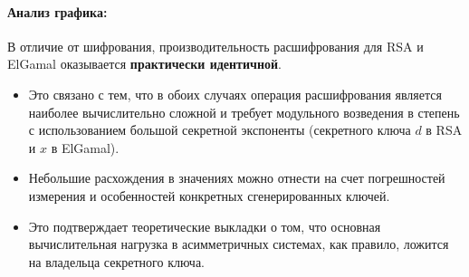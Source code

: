 \paragraph{Анализ графика:}
В отличие от шифрования, производительность расшифрования для RSA и ElGamal оказывается \textbf{практически идентичной}.
\begin{itemize}
    \item Это связано с тем, что в обоих случаях операция расшифрования является наиболее вычислительно сложной и требует модульного возведения в степень с использованием большой секретной экспоненты (секретного ключа $d$ в RSA и $x$ в ElGamal). 
    \item Небольшие расхождения в значениях можно отнести на счет погрешностей измерения и особенностей конкретных сгенерированных ключей.
    \item Это подтверждает теоретические выкладки о том, что основная вычислительная нагрузка в асимметричных системах, как правило, ложится на владельца секретного ключа.
\end{itemize}

